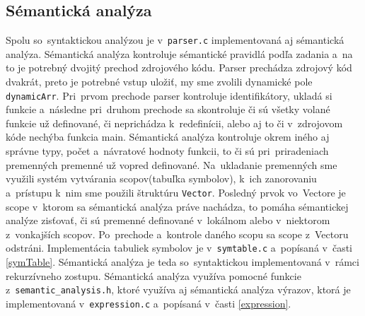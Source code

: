 \documentclass[a4paper, 12pt]{article}[25.11.2020]
\begin{document}
    \subsection{Sémantická analýza}
        \par Spolu so~syntaktickou analýzou je v~\verb|parser.c| implementovaná aj sémantická
        analýza. Sémantická analýza kontroluje sémantické pravidlá podľa zadania a~na to je 
        potrebný dvojitý prechod zdrojového kódu. Parser prechádza zdrojový kód dvakrát, preto
        je potrebné vstup uložiť, my sme zvolili dynamické pole \verb|dynamicArr|. Pri~prvom
        prechode parser kontroluje identifikátory, ukladá si funkcie a~následne pri~druhom 
        prechode sa skontroluje či sú všetky volané funkcie už definované, či neprichádza 
        k~redefinícii, alebo aj to či v~zdrojovom kóde nechýba funkcia main. Sémantická analýza
        kontroluje okrem iného aj správne typy, počet a~návratové hodnoty funkcii, to či sú
        pri~priradeniach premenných premenné už vopred definované. Na~ukladanie premenných sme
        využili systém vytvárania scopov(tabuľka symbolov), k~ich zanorovaniu a~prístupu k~nim
        sme použili štruktúru \verb|Vector|. Posledný prvok vo~Vectore je scope v~ktorom sa
        sémantická analýza práve nachádza, to pomáha sémantickej analýze zisťovať, či sú
        premenné definované v~lokálnom alebo v~niektorom z~vonkajších scopov. Po~prechode
        a~kontrole daného scopu sa scope z~Vectoru odstráni. Implementácia tabuliek symbolov je
        v~\verb|symtable.c| a~popísaná v~časti \ref{symTable}. Sémantická analýza je teda
        so~syntaktickou implementovaná v~rámci rekurzívneho zostupu. Sémantická analýza využíva
        pomocné funkcie z~\verb|semantic_analysis.h|, ktoré využíva aj sémantická analýza
        výrazov, ktorá je implementovaná v~\verb|expression.c| a~popísaná v~časti
        \ref{expression}.
\end{document}

